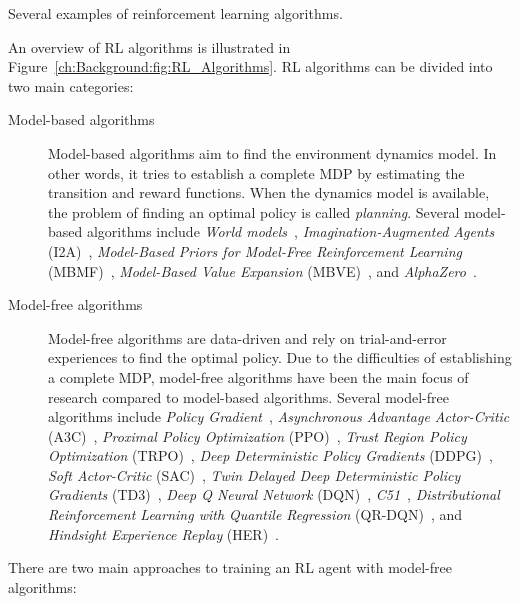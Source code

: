 %
{Several examples of reinforcement learning algorithms.\label{ch:Background:fig:RL_Algorithms}}

An overview of RL algorithms is illustrated in Figure~\ref{ch:Background:fig:RL_Algorithms}.
RL algorithms can be divided into two main categories:

\begin{description}
  \item[Model-based algorithms]
        Model-based algorithms aim to find the environment dynamics model.
        In other words,
        it tries to establish a complete MDP by estimating the transition and reward functions.
        When the dynamics model is available,
        the problem of finding an optimal policy is called \textit{planning}.
        Several model-based algorithms include \textit{World models}~\cite{RL_Algo_WM},
        \textit{Imagination-Augmented Agents} (I2A)~\cite{RL_Algo_I2A},
        \textit{Model-Based Priors for Model-Free Reinforcement Learning} (MBMF)~\cite{RL_Algo_MBMF},
        \textit{Model-Based Value Expansion} (MBVE)~\cite{RL_Algo_MBVE},
        and \textit{AlphaZero}~\cite{RL_Algo_AlphaZero}.
  \item[Model-free algorithms]
        Model-free algorithms are data-driven and rely on trial-and-error experiences to find the optimal policy.
        Due to the difficulties of establishing a complete MDP,
        model-free algorithms have been the main focus of research compared to model-based algorithms.
        Several model-free algorithms include \textit{Policy Gradient}~\cite{},
        \textit{Asynchronous Advantage Actor-Critic} (A3C)~\cite{RL_Algo_A3C},
        \textit{Proximal Policy Optimization} (PPO)~\cite{RL_Algo_PPO},
        \textit{Trust Region Policy Optimization} (TRPO)~\cite{RL_Algo_TRPO},
        \textit{Deep Deterministic Policy Gradients} (DDPG)~\cite{RL_Algo_DDPG},
        \textit{Soft Actor-Critic} (SAC)~\cite{RL_Algo_SAC},
        \textit{Twin Delayed Deep Deterministic Policy Gradients} (TD3)~\cite{RL_Algo_TD3},
        \textit{Deep Q Neural Network} (DQN)~\cite{RL_Algo_DQN},
        \textit{C51}~\cite{RL_Algo_C51},
        \textit{Distributional Reinforcement Learning with Quantile Regression} (QR-DQN)~\cite{RL_Algo_QRDQN},
        and \textit{Hindsight Experience Replay} (HER)~\cite{RL_Algo_HER}.
\end{description}

There are two main approaches to training an RL agent with model-free algorithms:


